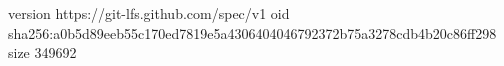 version https://git-lfs.github.com/spec/v1
oid sha256:a0b5d89eeb55c170ed7819e5a4306404046792372b75a3278cdb4b20c86ff298
size 349692
